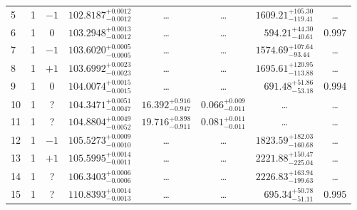 \begin{table*}[!]
\begin{tabular}{llcrrlrc}
5 & 1 & $-1$ & $    102.8187_{-      0.0012}^{+      0.0012}$ & \multicolumn{1}{c}{\dots} & \multicolumn{1}{c}{\dots} & $     1609.21_{-      119.41}^{+      105.30}$ & \dots \\[1pt]
6 & 1 & 0 & $    103.2948_{-      0.0012}^{+      0.0013}$ & \multicolumn{1}{c}{\dots} & \multicolumn{1}{c}{\dots} & $      594.21_{-       40.61}^{+       44.30}$ & 0.997\\[1pt]
7 & 1 & $-1$ & $    103.6020_{-      0.0005}^{+      0.0005}$ & \multicolumn{1}{c}{\dots} & \multicolumn{1}{c}{\dots} & $     1574.69_{-       93.44}^{+      107.64}$ & \dots \\[1pt]
8 & 1 & $+1$ & $    103.6992_{-      0.0023}^{+      0.0023}$ & \multicolumn{1}{c}{\dots} & \multicolumn{1}{c}{\dots} & $     1695.61_{-      113.88}^{+      120.95}$ & \dots \\[1pt]
9 & 1 & 0 & $    104.0074_{-      0.0015}^{+      0.0015}$ & \multicolumn{1}{c}{\dots} & \multicolumn{1}{c}{\dots} & $      691.48_{-       53.18}^{+       51.86}$ & 0.994\\[1pt]
10 & 1 & ? & $    104.3471_{-      0.0047}^{+      0.0051}$ & $      16.392_{-       0.947}^{+       0.916}$ & $       0.066_{-       0.011}^{+       0.009}$ & \multicolumn{1}{c}{\dots} & \dots \\[1pt]
11 & 1 & ? & $    104.8804_{-      0.0052}^{+      0.0049}$ & $      19.716_{-       0.911}^{+       0.898}$ & $       0.081_{-       0.011}^{+       0.011}$ & \multicolumn{1}{c}{\dots} & \dots \\[1pt] 
12 & 1 & $-1$ & $    105.5273_{-      0.0010}^{+      0.0009}$ & \multicolumn{1}{c}{\dots} & \multicolumn{1}{c}{\dots} & $     1823.59_{-      160.68}^{+      182.03}$ & \dots \\[1pt]
13 & 1 & $+1$ & $    105.5995_{-      0.0011}^{+      0.0014}$ & \multicolumn{1}{c}{\dots} & \multicolumn{1}{c}{\dots} & $     2221.88_{-      225.04}^{+      150.47}$ & \dots \\[1pt]
14 & 1 & ? & $    106.3403_{-      0.0006}^{+      0.0006}$ & \multicolumn{1}{c}{\dots} & \multicolumn{1}{c}{\dots} & $     2226.83_{-      199.63}^{+      163.94}$ & \dots \\[1pt]
15 & 1 & ? & $    110.8393_{-      0.0013}^{+      0.0014}$ & \multicolumn{1}{c}{\dots} & \multicolumn{1}{c}{\dots} & $      695.34_{-       51.11}^{+       50.78}$ & 0.995\\[1pt]


\end{tabular}
\end{table*}
